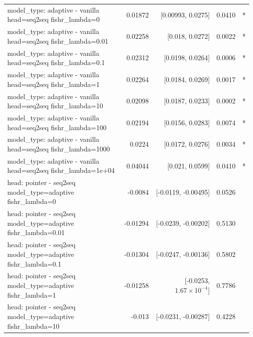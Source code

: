 \documentclass[10pt]{article}
\makeatletter
\newcommand{\stackcell}[1]{\begin{tabular}[t]{@{}l@{}}#1\end{tabular}}
\makeatother
\begin{document}
{\begin{longtable}{lrrrl}
\stackcell{model\_type: adaptive - vanilla\\\footnotesize head=seq2seq fishr\_lambda=0 } & 0.01872 & [0.00993, 0.0275] & 0.0410 & *\\
\stackcell{model\_type: adaptive - vanilla\\\footnotesize head=seq2seq fishr\_lambda=0.01 } & 0.02258 & [0.018, 0.0272] & 0.0022 & *\\
\stackcell{model\_type: adaptive - vanilla\\\footnotesize head=seq2seq fishr\_lambda=0.1 } & 0.02312 & [0.0198, 0.0264] & 0.0006 & *\\
\stackcell{model\_type: adaptive - vanilla\\\footnotesize head=seq2seq fishr\_lambda=1 } & 0.02264 & [0.0184, 0.0269] & 0.0017 & *\\
\stackcell{model\_type: adaptive - vanilla\\\footnotesize head=seq2seq fishr\_lambda=10 } & 0.02098 & [0.0187, 0.0233] & 0.0002 & *\\
\stackcell{model\_type: adaptive - vanilla\\\footnotesize head=seq2seq fishr\_lambda=100 } & 0.02194 & [0.0156, 0.0283] & 0.0074 & *\\
\stackcell{model\_type: adaptive - vanilla\\\footnotesize head=seq2seq fishr\_lambda=1000 } & 0.0224 & [0.0172, 0.0276] & 0.0034 & *\\
\stackcell{model\_type: adaptive - vanilla\\\footnotesize head=seq2seq fishr\_lambda=1e+04 } & 0.04044 & [0.021, 0.0599] & 0.0410 & *\\
\stackcell{head: pointer - seq2seq\\\footnotesize model\_type=adaptive fishr\_lambda=0 } & -0.0084 & [-0.0119, -0.00495] & 0.0526 & \\
\stackcell{head: pointer - seq2seq\\\footnotesize model\_type=adaptive fishr\_lambda=0.01 } & -0.01294 & [-0.0239, -0.00202] & 0.5130 & \\
\stackcell{head: pointer - seq2seq\\\footnotesize model\_type=adaptive fishr\_lambda=0.1 } & -0.01304 & [-0.0247, -0.00136] & 0.5802 & \\
\stackcell{head: pointer - seq2seq\\\footnotesize model\_type=adaptive fishr\_lambda=1 } & -0.01258 & [-0.0253, $1.67\times10^{-4}$] & 0.7786 & \\
\stackcell{head: pointer - seq2seq\\\footnotesize model\_type=adaptive fishr\_lambda=10 } & -0.013 & [-0.0231, -0.00287] & 0.4228 & \\

\end{longtable}}
\end{document}
